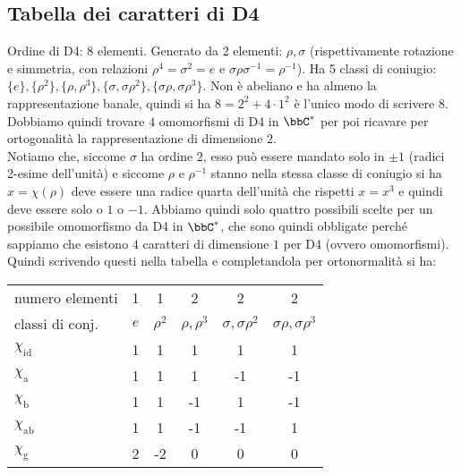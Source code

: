 \documentclass[a4paper,NoNotes,GeneralMath]{stdmdoc}
\begin{document}
	\subsection{Tabella dei caratteri di D4}
	Ordine di D4: 8 elementi. Generato da 2 elementi: $\rho, \sigma$ (rispettivamente rotazione e simmetria, con relazioni $\rho^4 = \sigma^2 = e$ e $\sigma \rho \sigma^{-1} = \rho^{-1}$). Ha 5 classi di coniugio: $\{e\}, \{\rho^2\}, \{\rho, \rho^3\}, \{\sigma, \sigma\rho^2\}, \{\sigma\rho, \sigma\rho^3\}$. Non è abeliano e ha almeno la rappresentazione banale, quindi si ha $8 = 2^2 + 4 \cdot 1^2$ è l'unico modo di scrivere $8$. Dobbiamo quindi trovare $4$ omomorfismi di D4 in $\bbC^{*}$ per poi ricavare per ortogonalità la rappresentazione di dimensione $2$. \\
	Notiamo che, siccome $\sigma$ ha ordine $2$, esso può essere mandato solo in $\pm 1$ (radici 2-esime dell'unità) e siccome $\rho$ e $\rho^{-1}$ stanno nella stessa classe di coniugio si ha $x = \chi(\rho)$ deve essere una radice quarta dell'unità che rispetti $x = x^3$ e quindi deve essere solo o $1$ o $-1$. Abbiamo quindi solo quattro possibili scelte per un possibile omomorfismo da D4 in $\bbC^{*}$, che sono quindi obbligate perché sappiamo che esistono $4$ caratteri di dimensione $1$ per D4 (ovvero omomorfismi). Quindi scrivendo questi nella tabella e completandola per ortonormalità si ha: \\
	\begin{center} \begin{tabular}{lccccc}
	numero elementi   & 1   & 1   & 2   & 2   & 2   \\
	classi di conj.   & $e$  & $\rho^2$ & $\rho, \rho^3$ & $\sigma, \sigma\rho^2$ & $\sigma\rho, \sigma\rho^3$ \\ \hline
	$\chi_\text{id}$  & 1   & 1   & 1   & 1   & 1   \\
	$\chi_\text{a}$   & 1   & 1   & 1   & -1  & -1  \\
	$\chi_\text{b}$   & 1   & 1   & -1  & 1   & -1  \\
	$\chi_\text{ab}$  & 1   & 1   & -1  & -1  & 1   \\
	$\chi_\text{g}$   & 2   & -2  & 0   & 0   & 0   \\
	\end{tabular} \end{center} \vskip 0.5cm
\end{document}
